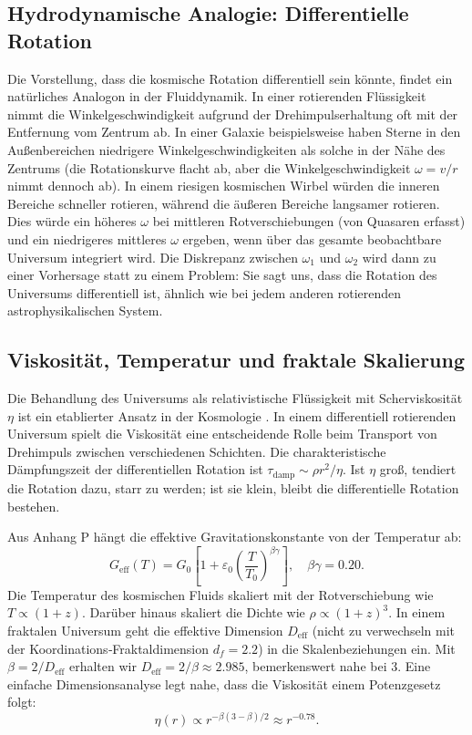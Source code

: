 \documentclass[11pt,a4paper]{article}
\begin{document}
	\subsection{Hydrodynamische Analogie: Differentielle Rotation}
	
	Die Vorstellung, dass die kosmische Rotation differentiell sein könnte, findet ein natürliches Analogon in der Fluiddynamik. In einer rotierenden Flüssigkeit nimmt die Winkelgeschwindigkeit aufgrund der Drehimpulserhaltung oft mit der Entfernung vom Zentrum ab. In einer Galaxie beispielsweise haben Sterne in den Außenbereichen niedrigere Winkelgeschwindigkeiten als solche in der Nähe des Zentrums (die Rotationskurve flacht ab, aber die Winkelgeschwindigkeit \(\omega = v/r\) nimmt dennoch ab). In einem riesigen kosmischen Wirbel würden die inneren Bereiche schneller rotieren, während die äußeren Bereiche langsamer rotieren. Dies würde ein höheres \(\omega\) bei mittleren Rotverschiebungen (von Quasaren erfasst) und ein niedrigeres mittleres \(\omega\) ergeben, wenn über das gesamte beobachtbare Universum integriert wird. Die Diskrepanz zwischen \(\omega_1\) und \(\omega_2\) wird dann zu einer Vorhersage statt zu einem Problem: Sie sagt uns, dass die Rotation des Universums differentiell ist, ähnlich wie bei jedem anderen rotierenden astrophysikalischen System.
	
	\subsection{Viskosität, Temperatur und fraktale Skalierung}
	
	Die Behandlung des Universums als relativistische Flüssigkeit mit Scherviskosität \(\eta\) ist ein etablierter Ansatz in der Kosmologie \cite{Giovannini2005}. In einem differentiell rotierenden Universum spielt die Viskosität eine entscheidende Rolle beim Transport von Drehimpuls zwischen verschiedenen Schichten. Die charakteristische Dämpfungszeit der differentiellen Rotation ist \(\tau_{\mathrm{damp}} \sim \rho r^2 / \eta\). Ist \(\eta\) groß, tendiert die Rotation dazu, starr zu werden; ist sie klein, bleibt die differentielle Rotation bestehen.
	
	Aus Anhang P hängt die effektive Gravitationskonstante von der Temperatur ab:
	\begin{equation}
		G_{\mathrm{eff}}(T) = G_0\left[1 + \varepsilon_0\left(\frac{T}{T_0}\right)^{\beta\gamma}\right], \quad \beta\gamma = 0.20.
	\end{equation}
	Die Temperatur des kosmischen Fluids skaliert mit der Rotverschiebung wie \(T \propto (1+z)\). Darüber hinaus skaliert die Dichte wie \(\rho \propto (1+z)^3\). In einem fraktalen Universum geht die effektive Dimension \(D_{\mathrm{eff}}\) (nicht zu verwechseln mit der Koordinations‑Fraktaldimension \(d_f = 2.2\)) in die Skalenbeziehungen ein. Mit \(\beta = 2/D_{\mathrm{eff}}\) erhalten wir \(D_{\mathrm{eff}} = 2/\beta \approx 2.985\), bemerkenswert nahe bei 3. Eine einfache Dimensionsanalyse legt nahe, dass die Viskosität einem Potenzgesetz folgt:
	\begin{equation}
		\eta(r) \propto r^{-\beta(3-\beta)/2} \approx r^{-0.78}.
	\end{equation}
	
\end{document}

